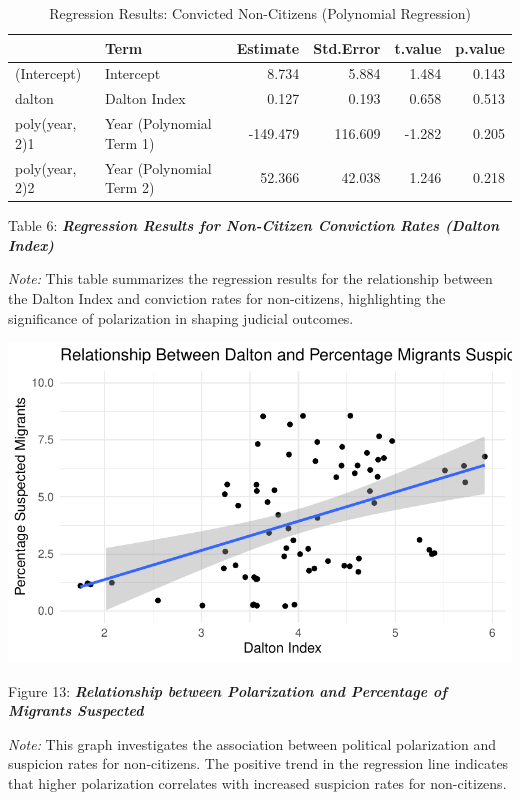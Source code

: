 \documentclass[
]{article}
\begin{document}
\begin{table}
\centering
\caption{Regression Results: Convicted Non-Citizens (Polynomial Regression)}
\centering
\begin{tabular}[t]{l|l|r|r|r|r}
\hline
  & Term & Estimate & Std.Error & t.value & p.value\\
\hline
(Intercept) & Intercept & 8.734 & 5.884 & 1.484 & 0.143\\
\hline
dalton & Dalton Index & 0.127 & 0.193 & 0.658 & 0.513\\
\hline
poly(year, 2)1 & Year (Polynomial Term 1) & -149.479 & 116.609 & -1.282 & 0.205\\
\hline
poly(year, 2)2 & Year (Polynomial Term 2) & 52.366 & 42.038 & 1.246 & 0.218\\
\hline
\end{tabular}
\end{table}

Table 6: \textbf{\emph{Regression Results for Non-Citizen Conviction
Rates (Dalton Index)}}

\emph{Note:} This table summarizes the regression results for the
relationship between the Dalton Index and conviction rates for
non-citizens, highlighting the significance of polarization in shaping
judicial outcomes.

\includegraphics{DataMan_Project_files/figure-pdf/unnamed-chunk-44-1.pdf}

Figure 13: \textbf{\emph{Relationship between Polarization and
Percentage of Migrants Suspected}}

\emph{Note:} This graph investigates the association between political
polarization and suspicion rates for non-citizens. The positive trend in
the regression line indicates that higher polarization correlates with
increased suspicion rates for non-citizens.
\end{document}
